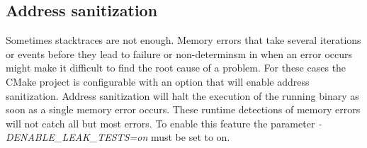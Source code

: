 \documentclass[conference]{IEEEtran}
\begin{document}
\subsection{Address sanitization}

Sometimes stacktraces are not enough. Memory errors that take several iterations
or events before they lead to failure or non-determinsm in when an error occurs
might make it difficult to find the root cause of a problem. For these cases the
CMake project is configurable with an option that will enable address
sanitization. Address sanitization will halt the execution of the running binary
as soon as a single memory error occurs. These runtime detections of memory
errors will not catch all but most errors. To enable this feature the parameter
\textit{-DENABLE\_LEAK\_TESTS=on} must be set to on.




\end{document}
